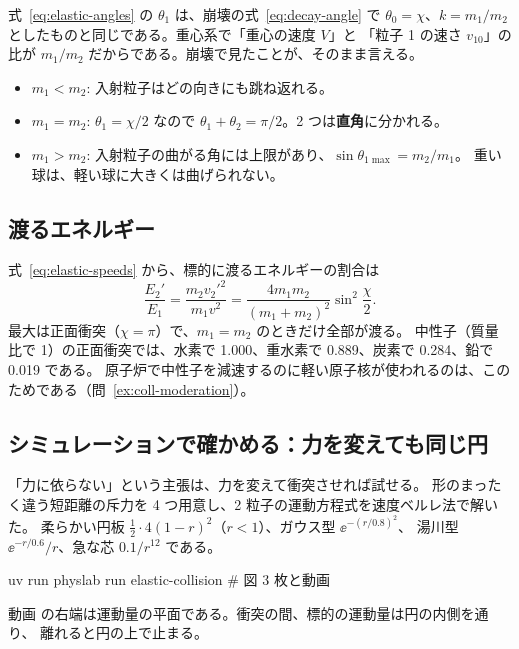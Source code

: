 式~\eqref{eq:elastic-angles} の $\theta_1$ は、崩壊の式~\eqref{eq:decay-angle} で
$\theta_0=\chi$、$k=m_1/m_2$ としたものと同じである。重心系で「重心の速度 $V$」と
「粒子 1 の速さ $v_{10}$」の比が $m_1/m_2$ だからである。崩壊で見たことが、そのまま言える。
\begin{itemize}
  \item $m_1<m_2$: 入射粒子はどの向きにも跳ね返れる。
  \item $m_1=m_2$: $\theta_1=\chi/2$ なので $\theta_1+\theta_2=\pi/2$。2 つは\textbf{直角}に分かれる。
  \item $m_1>m_2$: 入射粒子の曲がる角には上限があり、$\sin\theta_{1\max}=m_2/m_1$。
    重い球は、軽い球に大きくは曲げられない。
\end{itemize}

\subsection{渡るエネルギー}

式~\eqref{eq:elastic-speeds} から、標的に渡るエネルギーの割合は
\begin{equation}
  \frac{E_2'}{E_1}=\frac{m_2v_2'^2}{m_1v^2}=\frac{4m_1m_2}{(m_1+m_2)^2}\sin^2\frac\chi2 .
  \label{eq:energy-transfer}
\end{equation}
最大は正面衝突（$\chi=\pi$）で、$m_1=m_2$ のときだけ全部が渡る。
中性子（質量比で 1）の正面衝突では、水素で 1.000、重水素で 0.889、炭素で 0.284、鉛で 0.019 である。
原子炉で中性子を減速するのに軽い原子核が使われるのは、このためである（問~\ref{ex:coll-moderation}）。

\subsection{シミュレーションで確かめる：力を変えても同じ円}

「力に依らない」という主張は、力を変えて衝突させれば試せる。
形のまったく違う短距離の斥力を 4 つ用意し、2 粒子の運動方程式を速度ベルレ法で解いた。
柔らかい円板 $\tfrac12\cdot4(1-r)^2$（$r<1$）、ガウス型 $\ee^{-(r/0.8)^2}$、
湯川型 $\ee^{-r/0.6}/r$、急な芯 $0.1/r^{12}$ である。

\begin{simbox}
\begin{terminal}
uv run physlab run elastic-collision      # 図 3 枚と動画
\end{terminal}
動画  の右端は運動量の平面である。衝突の間、標的の運動量は円の内側を通り、
離れると円の上で止まる。
\end{simbox}

